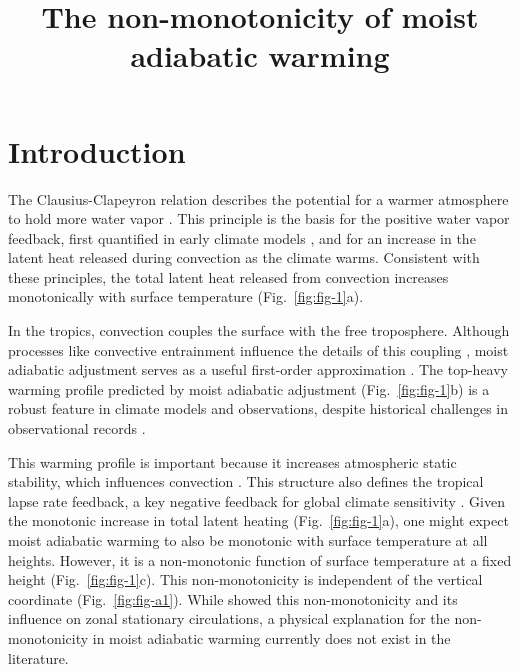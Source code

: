 \documentclass{ametsocV6.1}
\title{The non-monotonicity of moist adiabatic warming}
\affiliation{\aff{a}{Department of Geosciences, Union College, Schenectady New York, USA}}
\begin{document}
\maketitle

%
\section{Introduction}

The Clausius-Clapeyron relation describes the potential for a warmer atmosphere to hold more water vapor \citep{emanuel1994}. This principle is the basis for the positive water vapor feedback, first quantified in early climate models \citep{manabe1967}, and for an increase in the latent heat released during convection as the climate warms. Consistent with these principles, the total latent heat released from convection increases monotonically with surface temperature (Fig.~\ref{fig:fig-1}a).

In the tropics, convection couples the surface with the free troposphere. Although processes like convective entrainment influence the details of this coupling \citep{miyawaki2020}, moist adiabatic adjustment serves as a useful first-order approximation \citep{held1993}. The top-heavy warming profile predicted by moist adiabatic adjustment (Fig.~\ref{fig:fig-1}b) is a robust feature in climate models and observations, despite historical challenges in observational records \citep{vallis2015, santer2005}.

This warming profile is important because it increases atmospheric static stability, which influences convection \citep{neelin1987}. This structure also defines the tropical lapse rate feedback, a key negative feedback for global climate sensitivity \citep{hansen1984}. Given the monotonic increase in total latent heating (Fig.~\ref{fig:fig-1}a), one might expect moist adiabatic warming to also be monotonic with surface temperature at all heights. However, it is a non-monotonic function of surface temperature at a fixed height (Fig.~\ref{fig:fig-1}c). This non-monotonicity is independent of the vertical coordinate (Fig.~\ref{fig:fig-a1}). While \citet{levine2016} showed this non-monotonicity and its influence on zonal stationary circulations, a physical explanation for the non-monotonicity in moist adiabatic warming currently does not exist in the literature.
\end{document}
